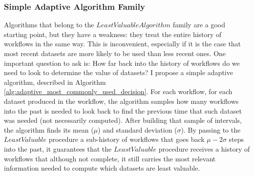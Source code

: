 \subsubsection{Simple Adaptive Algorithm Family}
Algorithms that belong to the $Least Valuable Algorithm$ family are a good starting point, but they have a weakness: they treat the entire history of workflows in the same way.  This is inconvenient, especially if it is the case that most recent datasets are more likely to be used than less recent ones.  One important question to ask is: How far back into the history of workflows do we need to look to determine the value of datasets? I propose a simple adaptive algorithm, described in Algorithm \ref{alg:adaptive_most_commonly_used_decision}.  For each workflow, for each dataset produced in the workflow, the algorithm samples how many workflows into the past is needed to look back to find the previous time that such dataset was needed (not necessarily computed).  After building that sample of intervals, the algorithm finds its mean ($\mu$) and standard deviation ($\sigma$).  By passing to the $LeastValuable$ procedure a sub-history of workflows that goes back $\mu - 2\sigma$ steps into the past, it guarantees that the $LeastValuable$ procedure receives a history of workflows that although not complete, it still carries the most relevant information needed to compute which datasets are least valuable.

